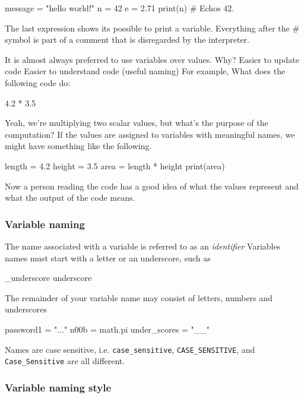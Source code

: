 \documentclass[12pt,letterpaper,twoside]{article}
\begin{document}
\begin{python}
message = "hello world!"
n = 42
e = 2.71
print(n)  # Echos 42.
\end{python}

The last expression shows its possible to print a variable. Everything
after the \# symbol is part of a comment that is disregarded by the interpreter.

It is almost always preferred to use variables over values. Why?
Easier to update code
Easier to understand code (useful naming)
For example, What does the following code do:

\begin{python}
4.2 * 3.5
\end{python}

Yeah, we're multiplying two scalar values, but what's the purpose of
the computation?
If the values are assigned to variables with meaningful names, we
might have something like the following.

\begin{python}
length = 4.2
height = 3.5
area = length * height
print(area)
\end{python}

Now a person reading the code has a good idea of what the values
represent and what the output of the code means.

\subsubsection{Variable naming}

The name associated with a variable is referred to as an
\emph{identifier}
Variables names must start with a letter or an underscore, such as

\begin{python}
_underscore
underscore
\end{python}

The remainder of your variable name may consist of letters, numbers
and underscores


\begin{python}
password1 = "..."
n00b = math.pi
under_scores = "__"
\end{python}

Names are case sensitive, i.e. \texttt{case\_sensitive},
\texttt{CASE\_SENSITIVE}, and \texttt{Case\_Sensitive} are all different.

\subsubsection{Variable naming style}
\end{document}
